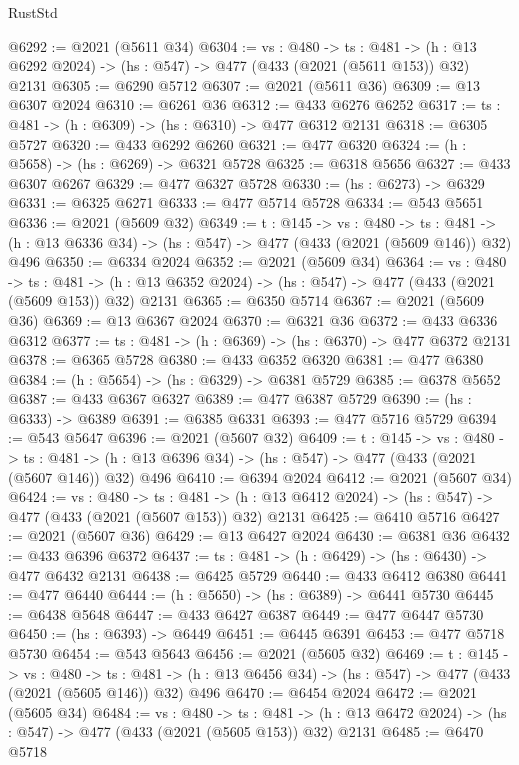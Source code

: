 \begin{lexlean}{RustStd}
\begin{coremodule}
{\begin{coremodule}
{{{{{{{{{{{{{{{{@6292 := @2021 (@5611 @34)
@6304 := {vs : @480} ->
  {ts : @481} -> (h : @13 @6292 @2024) -> (hs : @547) -> @477 (@433 (@2021 (@5611 @153)) @32) @2131
@6305 := @6290 @5712
@6307 := @2021 (@5611 @36)
@6309 := @13 @6307 @2024
@6310 := @6261 @36
@6312 := @433 @6276 @6252
@6317 := {ts : @481} -> (h : @6309) -> (hs : @6310) -> @477 @6312 @2131
@6318 := @6305 @5727
@6320 := @433 @6292 @6260
@6321 := @477 @6320
@6324 := (h : @5658) -> (hs : @6269) -> @6321 @5728
@6325 := @6318 @5656
@6327 := @433 @6307 @6267
@6329 := @477 @6327 @5728
@6330 := (hs : @6273) -> @6329
@6331 := @6325 @6271
@6333 := @477 @5714 @5728
@6334 := @543 @5651
@6336 := @2021 (@5609 @32)
@6349 := {t : @145} ->
  {vs : @480} ->
  {ts : @481} -> (h : @13 @6336 @34) -> (hs : @547) -> @477 (@433 (@2021 (@5609 @146)) @32) @496
@6350 := @6334 @2024
@6352 := @2021 (@5609 @34)
@6364 := {vs : @480} ->
  {ts : @481} -> (h : @13 @6352 @2024) -> (hs : @547) -> @477 (@433 (@2021 (@5609 @153)) @32) @2131
@6365 := @6350 @5714
@6367 := @2021 (@5609 @36)
@6369 := @13 @6367 @2024
@6370 := @6321 @36
@6372 := @433 @6336 @6312
@6377 := {ts : @481} -> (h : @6369) -> (hs : @6370) -> @477 @6372 @2131
@6378 := @6365 @5728
@6380 := @433 @6352 @6320
@6381 := @477 @6380
@6384 := (h : @5654) -> (hs : @6329) -> @6381 @5729
@6385 := @6378 @5652
@6387 := @433 @6367 @6327
@6389 := @477 @6387 @5729
@6390 := (hs : @6333) -> @6389
@6391 := @6385 @6331
@6393 := @477 @5716 @5729
@6394 := @543 @5647
@6396 := @2021 (@5607 @32)
@6409 := {t : @145} ->
  {vs : @480} ->
  {ts : @481} -> (h : @13 @6396 @34) -> (hs : @547) -> @477 (@433 (@2021 (@5607 @146)) @32) @496
@6410 := @6394 @2024
@6412 := @2021 (@5607 @34)
@6424 := {vs : @480} ->
  {ts : @481} -> (h : @13 @6412 @2024) -> (hs : @547) -> @477 (@433 (@2021 (@5607 @153)) @32) @2131
@6425 := @6410 @5716
@6427 := @2021 (@5607 @36)
@6429 := @13 @6427 @2024
@6430 := @6381 @36
@6432 := @433 @6396 @6372
@6437 := {ts : @481} -> (h : @6429) -> (hs : @6430) -> @477 @6432 @2131
@6438 := @6425 @5729
@6440 := @433 @6412 @6380
@6441 := @477 @6440
@6444 := (h : @5650) -> (hs : @6389) -> @6441 @5730
@6445 := @6438 @5648
@6447 := @433 @6427 @6387
@6449 := @477 @6447 @5730
@6450 := (hs : @6393) -> @6449
@6451 := @6445 @6391
@6453 := @477 @5718 @5730
@6454 := @543 @5643
@6456 := @2021 (@5605 @32)
@6469 := {t : @145} ->
  {vs : @480} ->
  {ts : @481} -> (h : @13 @6456 @34) -> (hs : @547) -> @477 (@433 (@2021 (@5605 @146)) @32) @496
@6470 := @6454 @2024
@6472 := @2021 (@5605 @34)
@6484 := {vs : @480} ->
  {ts : @481} -> (h : @13 @6472 @2024) -> (hs : @547) -> @477 (@433 (@2021 (@5605 @153)) @32) @2131
@6485 := @6470 @5718
}}}}}}}}}}}}}}}}
\end{coremodule}}
\end{coremodule}
\end{lexlean}
